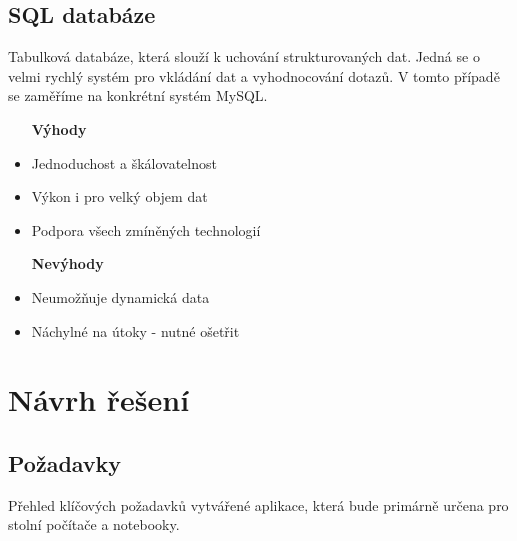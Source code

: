 \documentclass[twoside]{ctuthesis}
\begin{document}
\section{SQL databáze}
Tabulková databáze, která slouží k uchování strukturovaných dat. Jedná se o velmi rychlý systém pro vkládání dat a vyhodnocování dotazů. V tomto případě se zaměříme na konkrétní systém MySQL.
\begin{itemize}
\setlength{\itemindent}{0.7cm}
    \item [\textbf{Výhody}]
    \item Jednoduchost a škálovatelnost
    \item Výkon i pro velký objem dat
    \item Podpora všech zmíněných technologií
\end{itemize}
\begin{itemize}
\setlength{\itemindent}{1.1cm}
    \item [\textbf{Nevýhody}]
    \setlength{\itemindent}{0.7cm}
    \item Neumožňuje dynamická data
    \item Náchylné na útoky - nutné ošetřit
\end{itemize}

\chapter{Návrh řešení}

\section{Požadavky}
Přehled klíčových požadavků vytvářené aplikace, která bude primárně určena pro stolní počítače a notebooky.
\end{document}
